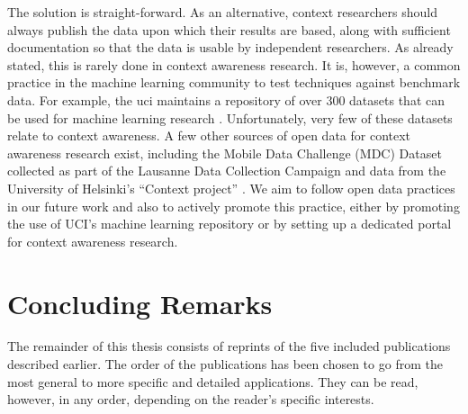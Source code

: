The solution is straight-forward. As an alternative, context researchers should always publish the data upon which their results are based, along with sufficient documentation so that the data is usable by independent researchers. As already stated, this is rarely done in context awareness research. It is, however, a common practice in the machine learning community to test techniques against benchmark data. For example, the \gls{uci} maintains a repository of over 300 datasets that can be used for machine learning research \cite{Lichman2015}. Unfortunately, very few of these datasets relate to context awareness. A few other sources of open data for context awareness research exist, including the Mobile Data Challenge (MDC) Dataset collected as part of the Lausanne Data Collection Campaign \cite{laurila2012mobile} and data from the University of Helsinki's ``Context project'' \cite{Raento2005}. We aim to follow open data practices in our future work and also to actively promote this practice, either by promoting the use of UCI's machine learning repository or by setting up a dedicated portal for context awareness research.

\section{Concluding Remarks}
\label{sec:concluding_remarks}

The remainder of this thesis consists of reprints of the five included publications described earlier. The order of the publications has been chosen to go from the most general to more specific and detailed applications. They can be read, however, in any order, depending on the reader's specific interests.

